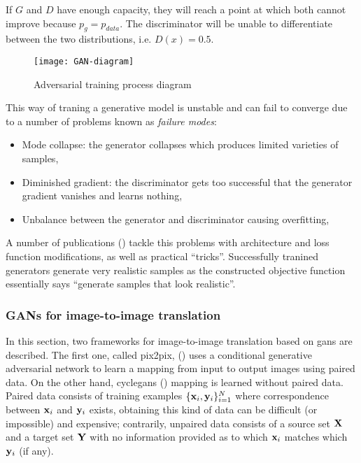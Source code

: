 \documentclass[../main.tex]{subfiles}
\begin{document}
If $G$ and $D$ have enough capacity, they will reach a point at which both cannot
improve because $p_g = p_{data}$.
The discriminator will be unable to differentiate between the two distributions,
i.e. $D(x) = 0.5$.

\begin{figure}[H]
\centering
\texttt{[image: GAN-diagram]}
\caption{Adversarial training process diagram}
\label{fig:gan-diagram}
\end{figure}

This way of traning a generative model is unstable and can fail to converge due
to a number of problems known as \emph{failure modes}:
\begin{itemize}
  \item Mode collapse: the generator collapses which produces limited varieties
  of samples,
  \item Diminished gradient: the discriminator gets too successful that the
  generator gradient vanishes and learns nothing,
  \item Unbalance between the generator and discriminator causing overfitting,
\end{itemize}

A number of publications
(\cite{Arjovsky2017,miyato2018spectral,DBLP:journals/corr/SalimansGZCRC16})
tackle this problems with architecture and loss function modifications, as well as
practical ``tricks''.
Successfully tranined generators generate
very realistic samples as the constructed objective function essentially says
``generate samples that look realistic''.

\subsubsection{GANs for image-to-image translation}
\label{sec:gans-translation}

In this section, two frameworks for image-to-image translation based on \gls{gans}
are described. The first one, called pix2pix, (\cite{Isola2016}) uses a
conditional generative adversarial network to learn a mapping from input to
output images using paired data.
On the other hand, \gls{cyclegans} (\cite{Zhu2017a}) mapping is learned
without paired data.
Paired data consists of training examples
$\{\mathbf{x}_i, \mathbf{y}_i\}_{i=1}^N$
where correspondence between $\mathbf{x}_i$ and $\mathbf{y}_i$ exists, obtaining
this kind of data can be difficult (or impossible) and expensive; contrarily,
unpaired data consists of a source set $\mathbf{X}$ and a target set $\mathbf{Y}$
with no information provided as to which $\mathbf{x}_i$ matches which
$\mathbf{y}_i$ (if any).
\end{document}
